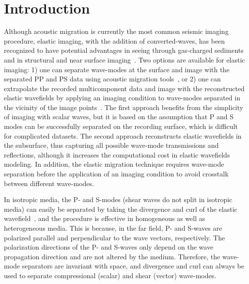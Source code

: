 
\section{Introduction}

Although acoustic migration is currently the most common seismic
imaging procedure, elastic imaging, with the addition of
converted-waves, has been recognized to have potential advantages in
seeing through gas-charged sediments and in structural and near
surface imaging~\cite[]{GEO68-01-00400057}. Two options are available
for elastic imaging: 1) one can separate wave-modes at the surface and
image with the separated PP and PS data using acoustic migration
tools~\cite[]{GEO69-01-02860297}, or 2) one can extrapolate the
recorded multicomponent data and image with the reconstructed elastic
wavefields by applying an imaging condition to wave-modes separated in the
vicinity of the image points~\cite[]{yan:S229}.  The first approach
benefits from the simplicity of imaging with scalar waves, but it is
based on the assumption that P and S modes can be successfully
separated on the recording surface, which is difficult for complicated
datasets. The second approach reconstructs elastic wavefields in the
subsurface, thus capturing all possible wave-mode transmissions and
reflections, although it increases the computational cost in elastic
wavefields modeling. In addition, the elastic migration technique
requires wave-mode separation before the application of an imaging
condition to avoid crosstalk between different wave-modes.

In isotropic media, the P- and S-modes (shear waves do not split in
isotropic media) can easily be separated by taking the divergence and
curl of the elastic wavefield~\cite[]{akirichards.2002}, and the
procedure is effective in homogeneous as well as heterogeneous
media. This is because, in the far field, P- and S-waves are polarized
parallel and perpendicular to the wave vectors, respectively. The
polarization directions of the P- and S-waves only depend on the wave
propagation direction and are not altered by the medium.  Therefore,
the wave-mode separators are invariant with space, and divergence and
curl can always be used to separate compressional (scalar) and shear
(vector) wave-modes.

